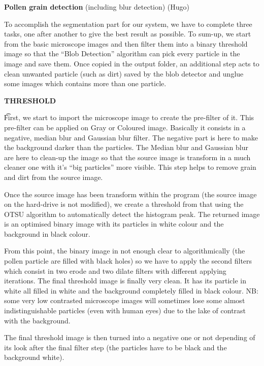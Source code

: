 \textbf{Pollen grain detection} (including blur detection) (Hugo)

To accomplish the segmentation part for our system, we have to complete three tasks, one after another to give the best result as possible.
	To sum-up, we start from the basic microscope images and then filter them into a binary threshold image so that the “Blob Detection” algorithm can pick every particle in the image and save them. Once copied in the output folder, an additional step acts to clean unwanted particle (such as dirt) saved by the blob detector and unglue some images which contains more than one particle.

\textbf{THRESHOLD}

\t First, we start to import the microscope image to create the pre-filter of it. This pre-filter can be applied on Gray or Coloured image. Basically it consists in a negative, median blur and Gaussian blur filter. The negative part is here to make the background darker than the particles. The Median blur and Gaussian blur are here to clean-up the image so that the source image is transform in a much cleaner one with it's “big particles” more visible. This step helps to remove grain and dirt from the source image.
	
	Once the source image has been transform within the program (the source image on the hard-drive is not modified), we create a threshold from that using the OTSU algorithm to automatically detect the histogram peak. The returned image is an optimised binary image with its particles in white colour and the background in black colour.
	
	From this point, the binary image in not enough clear to algorithmically (the pollen particle are filled with black holes) so we have to apply the second filters which consist in two erode and two dilate filters with different applying iterations. The final threshold image is finally very clean. It has its particle in white all filled in white and the background completely filled in black colour. NB: some very low contrasted microscope images will sometimes lose some almost indistinguishable particles (even with human eyes) due to the lake of contrast with the background.
	
	The final threshold image is then turned into a negative one or not depending of its look after the final filter step (the particles have to be black and the background white).
    
    
    
    